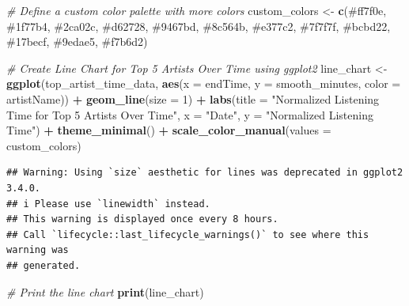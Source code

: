 \documentclass[
]{article}
\newenvironment{Shaded}{\begin{snugshade}}{\end{snugshade}}
\newcommand{\AttributeTok}[1]{\textcolor[rgb]{0.13,0.29,0.53}{#1}}
\newcommand{\CommentTok}[1]{\textcolor[rgb]{0.56,0.35,0.01}{\textit{#1}}}
\newcommand{\DecValTok}[1]{\textcolor[rgb]{0.00,0.00,0.81}{#1}}
\newcommand{\FunctionTok}[1]{\textcolor[rgb]{0.13,0.29,0.53}{\textbf{#1}}}
\newcommand{\NormalTok}[1]{#1}
\newcommand{\OtherTok}[1]{\textcolor[rgb]{0.56,0.35,0.01}{#1}}
\newcommand{\SpecialCharTok}[1]{\textcolor[rgb]{0.81,0.36,0.00}{\textbf{#1}}}
\newcommand{\StringTok}[1]{\textcolor[rgb]{0.31,0.60,0.02}{#1}}
\begin{document}
\begin{Shaded}
\begin{Highlighting}[]
\CommentTok{\# Define a custom color palette with more colors}
\NormalTok{custom\_colors }\OtherTok{\textless{}{-}} \FunctionTok{c}\NormalTok{(}\StringTok{\textquotesingle{}\#ff7f0e\textquotesingle{}}\NormalTok{, }\StringTok{\textquotesingle{}\#1f77b4\textquotesingle{}}\NormalTok{, }\StringTok{\textquotesingle{}\#2ca02c\textquotesingle{}}\NormalTok{, }\StringTok{\textquotesingle{}\#d62728\textquotesingle{}}\NormalTok{, }\StringTok{\textquotesingle{}\#9467bd\textquotesingle{}}\NormalTok{, }\StringTok{\textquotesingle{}\#8c564b\textquotesingle{}}\NormalTok{, }
                   \StringTok{\textquotesingle{}\#e377c2\textquotesingle{}}\NormalTok{, }\StringTok{\textquotesingle{}\#7f7f7f\textquotesingle{}}\NormalTok{, }\StringTok{\textquotesingle{}\#bcbd22\textquotesingle{}}\NormalTok{, }\StringTok{\textquotesingle{}\#17becf\textquotesingle{}}\NormalTok{, }\StringTok{\textquotesingle{}\#9edae5\textquotesingle{}}\NormalTok{, }\StringTok{\textquotesingle{}\#f7b6d2\textquotesingle{}}\NormalTok{)}

\CommentTok{\# Create Line Chart for Top 5 Artists Over Time using ggplot2}
\NormalTok{line\_chart }\OtherTok{\textless{}{-}} \FunctionTok{ggplot}\NormalTok{(top\_artist\_time\_data, }\FunctionTok{aes}\NormalTok{(}\AttributeTok{x =}\NormalTok{ endTime, }\AttributeTok{y =}\NormalTok{ smooth\_minutes, }\AttributeTok{color =}\NormalTok{ artistName)) }\SpecialCharTok{+}
  \FunctionTok{geom\_line}\NormalTok{(}\AttributeTok{size =} \DecValTok{1}\NormalTok{) }\SpecialCharTok{+}
  \FunctionTok{labs}\NormalTok{(}\AttributeTok{title =} \StringTok{"Normalized Listening Time for Top 5 Artists Over Time"}\NormalTok{,}
       \AttributeTok{x =} \StringTok{"Date"}\NormalTok{,}
       \AttributeTok{y =} \StringTok{"Normalized Listening Time"}\NormalTok{) }\SpecialCharTok{+}
  \FunctionTok{theme\_minimal}\NormalTok{() }\SpecialCharTok{+}
  \FunctionTok{scale\_color\_manual}\NormalTok{(}\AttributeTok{values =}\NormalTok{ custom\_colors)}
\end{Highlighting}
\end{Shaded}

\begin{verbatim}
## Warning: Using `size` aesthetic for lines was deprecated in ggplot2 3.4.0.
## i Please use `linewidth` instead.
## This warning is displayed once every 8 hours.
## Call `lifecycle::last_lifecycle_warnings()` to see where this warning was
## generated.
\end{verbatim}

\begin{Shaded}
\begin{Highlighting}[]
\CommentTok{\# Print the line chart}
\FunctionTok{print}\NormalTok{(line\_chart)}
\end{Highlighting}
\end{Shaded}
\end{document}

